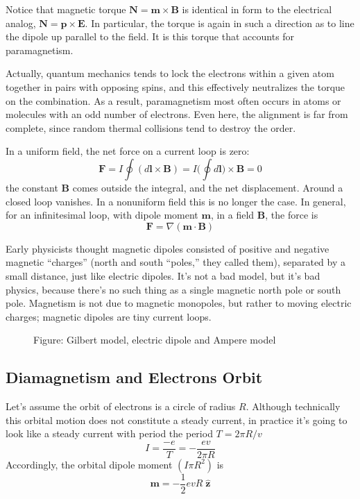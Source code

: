 \documentclass[../../../main.tex]{subfiles}
\begin{document}
Notice that magnetic torque $ \mathbf{N}=\mathbf{m}\times\mathbf{B}$ is identical in form to the electrical analog, $\mathbf{N} = \mathbf{p} \times \mathbf{E}$. In particular, the torque is again in such a direction as to line the dipole up parallel to the ﬁeld. It is this torque that accounts for paramagnetism.

Actually, quantum mechanics tends to lock the electrons within a given atom together in pairs with opposing spins, and this effectively neutralizes the torque on the combination. As a result, paramagnetism most often occurs in atoms or molecules with an odd number of electrons. Even here, the alignment is far from complete, since random thermal collisions tend to destroy the order.

In a uniform ﬁeld, the net force on a current loop is zero:
\begin{equation*}
    \mathbf{F}=I\oint (d\mathbf{l}\times \mathbf{B})=I\biggl(\oint d\mathbf{l}\biggr)\times \mathbf{B}=0
\end{equation*}
the constant \textbf{B} comes outside the integral, and the net displacement. Around a closed loop vanishes. In a nonuniform ﬁeld this is no longer the case. In general, for an inﬁnitesimal loop, with dipole moment $\mathbf{m}$, in a ﬁeld \textbf{B}, the force is
\begin{equation*}
    \mathbf{F}=\nabla(\mathbf{m}\cdot\mathbf{B})
\end{equation*}

Early physicists thought magnetic dipoles consisted of positive and negative magnetic “charges” (north and south “poles,” they called them), separated by a small distance, just like electric dipoles. It’s not a bad model, but it’s bad physics, because there’s no such thing as a single magnetic north pole or south pole. Magnetism is not due to magnetic monopoles, but rather to moving electric charges; magnetic dipoles are tiny current loops.
\begin{figure*}
    \centering
    \caption*{Figure: Gilbert model, electric dipole and Ampere model}
\end{figure*}

\subsection*{Diamagnetism and Electrons Orbit}
Let’s assume the  orbit of electrons is a circle of radius $R$. Although technically this orbital motion does not constitute a steady current, in practice it's going to look like a steady current with period the period $T = 2\pi R/v$
\begin{equation*}
    I=\frac{-e}{T}=-\frac{ev}{2\pi R}
\end{equation*}
Accordingly, the orbital dipole moment $(I \pi R^2)$ is
\begin{equation*}
    \mathbf{m}=-\frac{1}{2}evR \;\mathbf{\hat{z}}
\end{equation*}
\end{document}
